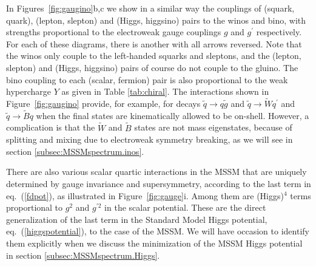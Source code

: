 \documentclass[11pt]{article}
\def\stilde{\widetilde}
\begin{document}
In Figures~\ref{fig:gaugino}b,c we
show in a similar way the couplings of (squark, quark), (lepton, slepton)
and (Higgs, higgsino) pairs to the winos and bino, with strengths
proportional to the electroweak gauge couplings $g$ and $g^\prime$
respectively. For each of these diagrams, there is another with all arrows
reversed. Note that the winos only couple to the left-handed squarks and
sleptons, and the (lepton, slepton) and (Higgs, higgsino) pairs of course
do not couple to the gluino. The bino coupling to each (scalar, fermion)
pair is also proportional to the weak hypercharge $Y$ as 
given in Table \ref{tab:chiral}.
The interactions shown in Figure~\ref{fig:gaugino} provide, for example,
for decays $\stilde q \rightarrow q\stilde g$ and $\stilde q \rightarrow
\stilde W q^\prime$ and $\stilde q \rightarrow \stilde B q$ when the final
states are kinematically allowed to be on-shell. However, a complication
is that the $\stilde W$ and $\stilde B$ states are not mass eigenstates,
because of splitting and mixing due to electroweak symmetry breaking, as
we will see in section \ref{subsec:MSSMspectrum.inos}. 

There are also various scalar quartic interactions in the MSSM that are
uniquely determined by gauge invariance and supersymmetry, according to
the last term in eq.~(\ref{fdpot}), as illustrated in
Figure~\ref{fig:gauge}i. Among them are (Higgs)$^4$ terms proportional to
$g^2$ and $g^{\prime 2}$ in the scalar potential. These are the direct
generalization of the last term in the Standard Model Higgs potential,
eq.~(\ref{higgspotential}), to the case of the MSSM. We will have occasion
to identify them explicitly when we discuss the minimization of the MSSM
Higgs potential in section \ref{subsec:MSSMspectrum.Higgs}. 
\end{document}
